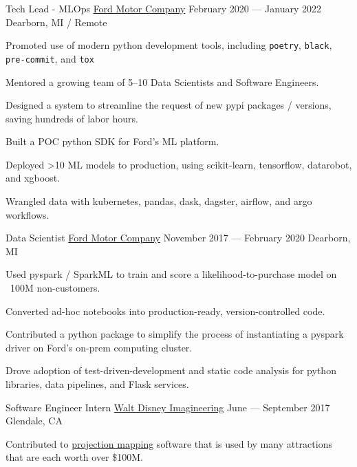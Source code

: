 \documentclass[letterpaper]{resume_config}
\newcommand{\code}[1]{\colorbox{light-gray}{\texttt{#1}}}
\begin{document}
\WorkExperience
    {Tech Lead - MLOps} %
    {\href{https://www.ford.com/}{Ford Motor Company}} %
    {February 2020 --- January 2022} %
    {Dearborn, MI / Remote} %
    {
        \item Promoted use of modern python development tools, including \code{poetry}, \code{black}, \code{pre-commit}, and \code{tox}
        \item Mentored a growing team of 5--10 Data Scientists and Software Engineers.
        \item Designed a system to streamline the request of new pypi packages / versions, saving hundreds of labor hours. 
        \item Built a POC python SDK for Ford's ML platform.
        \item Deployed >10 ML models to production, using scikit-learn, tensorflow, datarobot, and xgboost.
        \item Wrangled data with kubernetes, pandas, dask, dagster, airflow, and argo workflows.
    }

\WorkExperience
    {Data Scientist} %
    {\href{https://www.ford.com/}{Ford Motor Company}} %
    {November 2017 --- February 2020} %
    {Dearborn, MI} %
    {
        \item Used pyspark / SparkML to train and score a likelihood-to-purchase model on ~100M non-customers.
        \item Converted ad-hoc notebooks into production-ready, version-controlled code.
        \item Contributed a python package to simplify the process of instantiating a pyspark driver on Ford's on-prem computing cluster.
        \item Drove adoption of test-driven-development and static code analysis for python libraries, data pipelines, and Flask services.
    }

\WorkExperience
    {Software Engineer Intern} %
    {\href{https://sites.disney.com/waltdisneyimagineering/}{Walt Disney Imagineering}} %
    {June --- September 2017} %
    {Glendale, CA} %
    {
        \item Contributed to \href{https://en.wikipedia.org/wiki/Projection_mapping}{projection mapping} software that is used by many attractions that are each worth over \$100M.
    }
\end{document}
